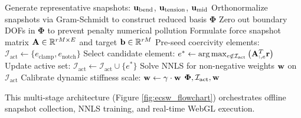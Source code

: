 \begin{algorithm}[htbp]
    \caption{Offline ECSW Training and Reduced Basis Generation}
    \label{alg:ecsw_training}
    \begin{algorithmic}[1]
        \State Generate representative snapshots: $\mathbf{u}_{\text{bend}}$, $\mathbf{u}_{\text{tension}}$, $\mathbf{u}_{\text{mid}}$
        \State Orthonormalize snapshots via Gram-Schmidt to construct reduced basis $\boldsymbol{\Phi}$
        \State Zero out boundary DOFs in $\boldsymbol{\Phi}$ to prevent penalty numerical pollution
        \State Formulate force snapshot matrix $\mathbf{A} \in \mathbb{R}^{rM \times E}$ and target $\mathbf{b} \in \mathbb{R}^{rM}$
        \State Pre-seed coercivity elements: $\mathcal{I}_{\text{act}} \gets \{e_{\text{clamp}}, e_{\text{notch}}\}$\footnotemark
        \State Select candidate element: $e^* \gets \arg\max_{e \notin \mathcal{I}_{\text{act}}} \left( \mathbf{A}_{:, e}^T \mathbf{r} \right)$
        \State Update active set: $\mathcal{I}_{\text{act}} \gets \mathcal{I}_{\text{act}} \cup \{e^*\}$
        \State Solve NNLS for non-negative weights $\mathbf{w}$ on $\mathcal{I}_{\text{act}}$
        \EndWhile
        \State Calibrate dynamic stiffness scale: $\mathbf{w} \gets \gamma \cdot \mathbf{w}$
        \State \Return $\boldsymbol{\Phi}, \mathcal{I}_{\text{act}}, \mathbf{w}$
        \EndProcedure
    \end{algorithmic}
\end{algorithm}

This multi-stage architecture (Figure \ref{fig:ecsw_flowchart}) orchestrates offline snapshot collection, NNLS training, and real-time WebGL execution.

